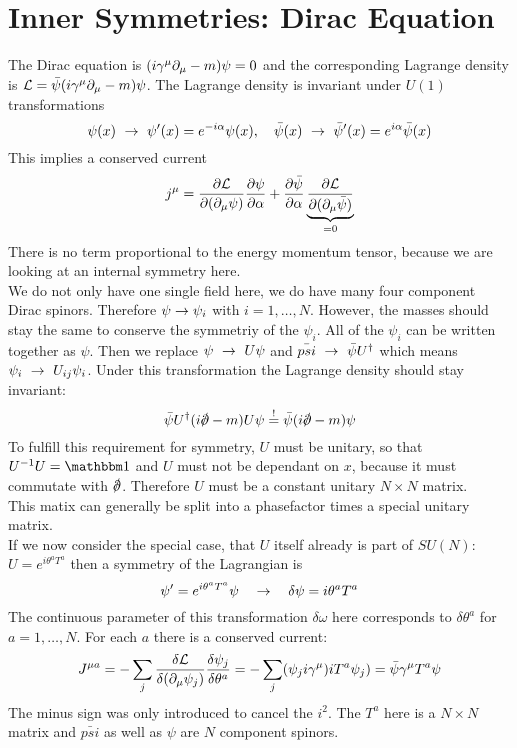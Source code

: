 \section{Inner Symmetries: Dirac Equation}
The Dirac equation is $(i \gamma^\mu \partial_\mu - m ) \psi = 0$ and the corresponding Lagrange density is $\mathcal{L} = \bar{\psi}(i \gamma^\mu \partial_\mu - m ) \psi$. The Lagrange density is invariant under $U(1)$ transformations
\[ \psi(x) ~\rightarrow~ \psi'(x) = e^{-i\alpha}\psi(x), ~~~ \bar{\psi}(x) ~\rightarrow~ \bar{\psi}'(x) = e^{i\alpha} \bar{\psi}(x)\]
This implies a conserved current
\[ j^\mu = \frac{\partial \mathcal{L}}{\partial ( \partial_\mu \psi)} \frac{\partial \psi}{\partial \alpha} + \frac{\partial \bar{\psi}}{\partial \alpha} \underbrace{ \frac{\partial \mathcal{L}}{\partial( \partial_\mu \bar{\psi})}}_{ = 0} \]
There is no term proportional to the energy momentum tensor, because we are looking at an internal symmetry here.\\
We do not only have one single field here, we do have many four component Dirac spinors. Therefore $\psi \rightarrow \psi_i$ with $i = 1, \ldots, N$. However, the masses should stay the same to conserve the symmetriy of the $\psi_i$. All of the $\psi_i$ can be written together as $\psi$. Then we replace $\psi ~\rightarrow~ U\psi$ and $\bar{psi} ~\rightarrow~ \bar{\psi}U^\dagger$ which means $\psi_i ~\rightarrow~ U_{ij}\psi_i$. Under this transformation the Lagrange density should stay invariant:
\[ \bar{\psi} U^\dagger ( i \slashed{\p} - m ) U \psi \soll \bar{\psi}(i \slashed{\p} - m ) \psi\]
To fulfill this requirement for symmetry, $U$ must be unitary, so that $U^{-1}U = \ehm$ and $U$ must not be dependant on $x$, because it must commutate with $\slashed{\p}$. Therefore $U$ must be a constant unitary $N \times N$ matrix.\\
This matix can generally be split into a phasefactor times a special unitary matrix.\\
If we now consider the special case, that $U$ itself already is part of $SU(N)$: $U = e^{i \theta^a T^a}$ then a symmetry of the Lagrangian is
\[ \psi' = e^{i \theta^a T^a} \psi ~~~\rightarrow ~~~ \delta \psi = i \theta^a T^a\]
The continuous parameter of this transformation $\delta \omega$ here corresponds to $\delta \theta^a$ for $a = 1, \ldots, N$. For each $a$ there is a conserved current:
\[ J^{\mu a} = - \sum_j \frac{\delta \mathcal{L}}{\delta( \partial_\mu \psi_j)} \frac{\delta \psi_j}{\delta \theta^a} = - \sum _j ( \psi_j i \gamma^\mu) i T^a \psi_j) = \bar{\psi} \gamma^\mu T^a \psi\]
The minus sign was only introduced to cancel the $i^2$. The $T^a$ here is a $N \times N$ matrix and $\bar{psi}$ as well as $\psi$ are $N$ component spinors.\\
